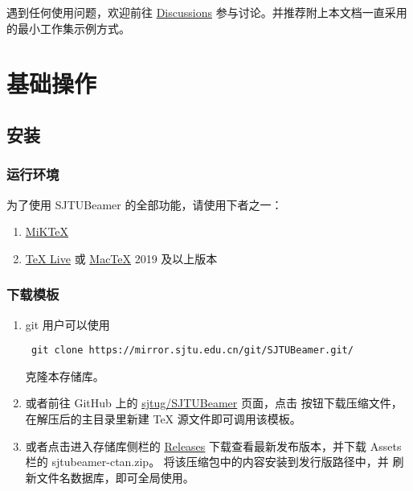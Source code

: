 \documentclass[
    UTF8,
    heading=true,
    12pt,
    a4paper
]{ctexrep}
\def\themename{\textsf{SJTUBeamer}}
\begin{document}
遇到任何使用问题，欢迎前往
\href{https://github.com/sjtug/SJTUBeamer/discussions}
{Discussions} 参与讨论。并推荐附上本文档一直采用的最小工作集示例方式。

\setcounter{tocdepth}{0}
\tableofcontents

\part{基础操作}
\chapter{安装}

\section{运行环境}

为了使用 \themename{} 的全部功能，请使用下者之一：
\begin{enumerate}
  \item \href{https://mirrors.sjtug.sjtu.edu.cn/ctan/systems/win32/miktex/setup/windows-x64/}{MiK\TeX{}}
  \item \href{https://mirrors.sjtug.sjtu.edu.cn/ctan/systems/texlive/Images/}
        {\TeX{} Live} 或
        \href{https://mirrors.sjtug.sjtu.edu.cn/ctan/systems/mac/mactex/}
        {Mac\TeX{}} 2019 及以上版本
\end{enumerate}

\section{下载模板}

\begin{enumerate}
  \item git 用户可以使用
        \begin{verbatim} git clone https://mirror.sjtu.edu.cn/git/SJTUBeamer.git/ \end{verbatim}
        克隆本存储库。
  \item 或者前往 GitHub 上的
        \faGithub{}
        \href{https://github.com/sjtug/SJTUBeamer}{sjtug/SJTUBeamer} 页面，点击
        按钮下载压缩文件，在解压后的主目录里新建 \TeX{}
        源文件即可调用该模板。
  \item 或者点击进入存储库侧栏的
        \href{https://github.com/sjtug/SJTUBeamer/releases}{\textsf{Releases}}
        下载查看最新发布版本，并下载 \textsf{Assets} 栏的
        \textsf{sjtubeamer-ctan.zip}。
        将该压缩包中的内容安装到发行版路径中，并
        刷新文件名数据库，即可全局使用。
\end{enumerate}
\end{document}
